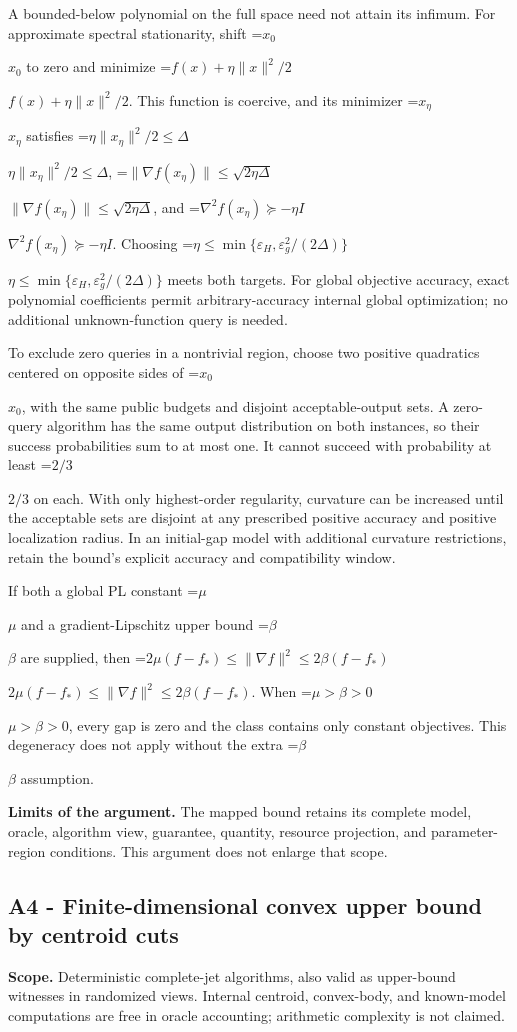 \documentclass[10pt,a4paper]{article}
\newcommand{\AtlasMath}[1]{\par\begingroup\centering\setbox0=\hbox{$\displaystyle #1$}\ifdim\wd0>1.4\linewidth\typeout{ATLAS WIDE FORMULA: \the\wd0}\fi\ifdim\wd0>\linewidth\resizebox{\linewidth}{!}{\box0}\else\box0\fi\par\endgroup}
\newcommand{\AtlasInlineMath}[1]{\begingroup\setbox0=\hbox{$#1$}\ifdim\wd0>.4\linewidth\endgroup\AtlasMath{#1}\else\endgroup$#1$\fi}
\begin{document}
A bounded-below polynomial on the full space need not attain its infimum. For approximate spectral stationarity, shift \AtlasInlineMath{x_0} to zero and minimize \AtlasInlineMath{f(x)+\eta\|x\|^2/2}. This function is coercive, and its minimizer \AtlasInlineMath{x_\eta} satisfies \AtlasInlineMath{\eta\|x_\eta\|^2/2\le\Delta}, \AtlasInlineMath{\|\nabla f(x_\eta)\|\le\sqrt{2\eta\Delta}}, and \AtlasInlineMath{\nabla^2f(x_\eta)\succeq-\eta I}. Choosing \AtlasInlineMath{\eta\le\min\{\varepsilon_H,\varepsilon_g^2/(2\Delta)\}} meets both targets. For global objective accuracy, exact polynomial coefficients permit arbitrary-accuracy internal global optimization; no additional unknown-function query is needed.

To exclude zero queries in a nontrivial region, choose two positive quadratics centered on opposite sides of \AtlasInlineMath{x_0}, with the same public budgets and disjoint acceptable-output sets. A zero-query algorithm has the same output distribution on both instances, so their success probabilities sum to at most one. It cannot succeed with probability at least \AtlasInlineMath{2/3} on each. With only highest-order regularity, curvature can be increased until the acceptable sets are disjoint at any prescribed positive accuracy and positive localization radius. In an initial-gap model with additional curvature restrictions, retain the bound's explicit accuracy and compatibility window.

If both a global PL constant \AtlasInlineMath{\mu} and a gradient-Lipschitz upper bound \AtlasInlineMath{\beta} are supplied, then \AtlasInlineMath{2\mu(f-f_*)\le\|\nabla f\|^2\le2\beta(f-f_*)}. When \AtlasInlineMath{\mu>\beta>0}, every gap is zero and the class contains only constant objectives. This degeneracy does not apply without the extra \AtlasInlineMath{\beta} assumption.

\textbf{Limits of the argument.} The mapped bound retains its complete model, oracle, algorithm view, guarantee, quantity, resource projection, and parameter-region conditions. This argument does not enlarge that scope.

\subsection{A4 - Finite-dimensional convex upper bound by centroid cuts}
\textbf{Scope.} Deterministic complete-jet algorithms, also valid as upper-bound witnesses in randomized views. Internal centroid, convex-body, and known-model computations are free in oracle accounting; arithmetic complexity is not claimed.
\end{document}
